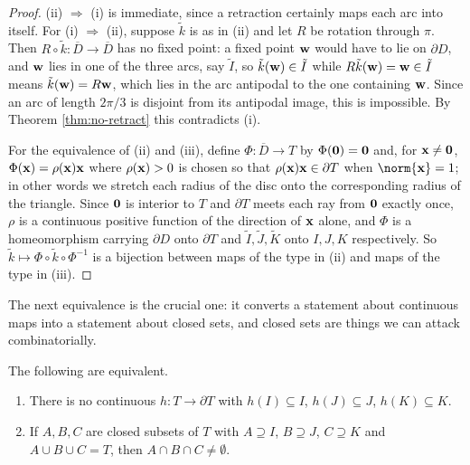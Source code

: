 \documentclass[a4paper]{scrartcl}
\newcommand{\dbar}{\overline{D}}
\begin{document}
\begin{proof}
	(ii) $\Rightarrow$ (i) is immediate, since a retraction certainly maps each arc into itself. For (i) $\Rightarrow$ (ii), suppose $\tilde k$ is as in (ii) and let $R$ be rotation through $\pi$. Then $R\circ \tilde k : \dbar \to \dbar$ has no fixed point: a fixed point $\mathbf{w}$ would have to lie on $\partial D$, and $\mathbf{w}$ lies in one of the three arcs, say $\tilde I$, so $\tilde k(\mathbf{w}) \in \tilde I$ while $R\tilde k(\mathbf{w}) = \mathbf{w} \in \tilde I$ means $\tilde k (\mathbf{w}) = R\mathbf{w}$, which lies in the arc antipodal to the one containing $\mathbf{w}$. Since an arc of length $2\pi/3$ is disjoint from its antipodal image, this is impossible. By Theorem \ref{thm:no-retract} this contradicts (i).

	For the equivalence of (ii) and (iii), define $\Phi : \dbar \to T$ by $\Phi(\mathbf{0}) = \mathbf{0}$ and, for $\mathbf{x} \neq \mathbf{0}$, $\Phi(\mathbf{x}) = \rho(\mathbf{x})\mathbf{x}$ where $\rho(\mathbf{x})>0$ is chosen so that $\rho(\mathbf{x})\mathbf{x} \in \partial T$ when $\norm{\vv{x}}=1$; in other words we stretch each radius of the disc onto the corresponding radius of the triangle. Since $\mathbf{0}$ is interior to $T$ and $\partial T$ meets each ray from $\mathbf{0}$ exactly once, $\rho$ is a continuous positive function of the direction of $\mathbf{x}$ alone, and $\Phi$ is a homeomorphism carrying $\partial D$ onto $\partial T$ and $\tilde I, \tilde J,\tilde K$ onto $I, J, K$ respectively. So $\tilde k \mapsto \Phi\circ\tilde k\circ\Phi^{-1}$ is a bijection between maps of the type in (ii) and maps of the type in (iii).
\end{proof}

The next equivalence is the crucial one: it converts a statement about continuous maps into a statement about closed sets, and closed sets are things we can attack combinatorially.

\begin{lemma}\label{lem:three-colours}
	The following are equivalent.
	\begin{enumerate}[label=(\roman*)]
		\item There is no continuous $h : T \to \partial T$ with $h(I)\subseteq I$, $h(J)\subseteq J$, $h(K)\subseteq K$.
		\item If $A, B, C$ are closed subsets of $T$ with $A \supseteq I$, $B\supseteq J$, $C \supseteq K$ and $A\cup B\cup C = T$, then $A \cap B \cap C \neq \emptyset$.
	\end{enumerate}
\end{lemma}
\end{document}
